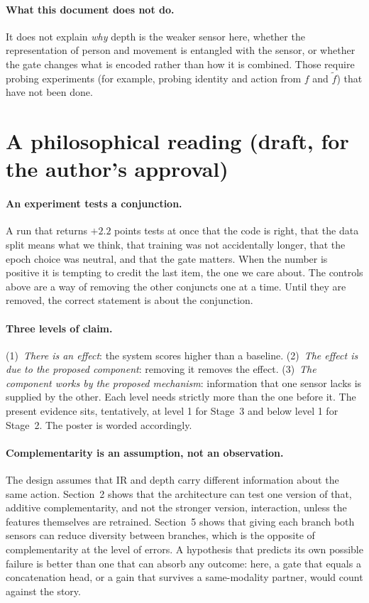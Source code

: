 \documentclass[11pt,a4paper]{article}
\theoremstyle{plain}
\theoremstyle{remark}
\begin{document}
\paragraph{What this document does not do.} It does not explain \emph{why} depth is the weaker sensor here, whether the representation of person and movement is entangled with the sensor, or whether the gate changes what is encoded rather than how it is combined. Those require probing experiments (for example, probing identity and action from $f$ and $\tilde f$) that have not been done.

\section{A philosophical reading \textnormal{\small(draft, for the author's approval)}}

\paragraph{An experiment tests a conjunction.} A run that returns $+2.2$ points tests at once that the code is right, that the data split means what we think, that training was not accidentally longer, that the epoch choice was neutral, and that the gate matters. When the number is positive it is tempting to credit the last item, the one we care about. The controls above are a way of removing the other conjuncts one at a time. Until they are removed, the correct statement is about the conjunction.

\paragraph{Three levels of claim.} (1)~\emph{There is an effect}: the system scores higher than a baseline. (2)~\emph{The effect is due to the proposed component}: removing it removes the effect. (3)~\emph{The component works by the proposed mechanism}: information that one sensor lacks is supplied by the other. Each level needs strictly more than the one before it. The present evidence sits, tentatively, at level 1 for Stage~3 and below level 1 for Stage~2. The poster is worded accordingly.

\paragraph{Complementarity is an assumption, not an observation.} The design assumes that IR and depth carry different information about the same action. Section~2 shows that the architecture can test one version of that, additive complementarity, and not the stronger version, interaction, unless the features themselves are retrained. Section~5 shows that giving each branch both sensors can reduce diversity between branches, which is the opposite of complementarity at the level of errors. A hypothesis that predicts its own possible failure is better than one that can absorb any outcome: here, a gate that equals a concatenation head, or a gain that survives a same-modality partner, would count against the story.
\end{document}
